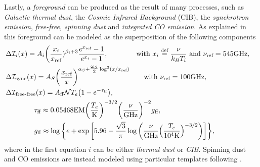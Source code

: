 Lastly, a \emph{foreground} can be produced as the result of many processes, such as \emph{Galactic thermal dust}, the \emph{Cosmic Infrared Background} (CIB), the \emph{synchrotron emission}, \emph{free-free, spinning dust} and \emph{integrated CO emission}. As explained in \cite{constraininginflationarypotentialspectral} this foreground can be modeled as the superposition of the following components
\begin{align*}
    &\Delta \mathcal I_i(x)=A_i\bigg(\frac{x_i}{x_{\text{ref}}})^{\beta_i+3} \frac{e^{x_{\text{ref}}}-1}{e^{x_i}-1},\qquad\qquad\text{with } x_i\stackrel{\text{def}}{=}\frac{\nu}{k_BT_i}\text{ and } \nu_\text{ref}=545\text{GHz},\\
    &\Delta \mathcal{I}_\text{sync} (x)= A_S\bigg(\frac{x_\text{ref}}{x}\bigg)^{\alpha_S+\tfrac{\omega_S}2\log^2(x/x_\text{ref})}\qquad \text{with }\nu_\text{ref}=100\text{GHz},\\
    &\Delta \mathcal{I}_\text{free-free}(x)= A_\text{ff} \mathcal{ N} T_e\big(1-e^{-\tau_{\text{ff}}}\big),&\\
    &\qquad\qquad\tau_\text{ff}\approx 0.05468\text{EM}\bigg(\frac{T_e}{\text{K}}\bigg)^{-3/2}\bigg(\frac{\nu}{\text{GHz}}\bigg)^{-2}g_\text{ff},& \\ &\qquad\qquad g_\text{ff}\approx \log\bigg\{ e+\exp\bigg[5.96-\frac{\sqrt{3}}{\pi}\log\bigg(\frac{\nu}{\text{GHz}}\Big(\frac{T_e}{10^4\text{K}}\Big)^{-3/2}\bigg)\bigg]\bigg\},
\end{align*}  
where in the first equation $i$ can be either \emph{thermal dust} or \emph{CIB}. Spinning dust and CO emissions are instead modeled using particular templates following \cite{refId0,10.1093/mnras/stx1653}.

